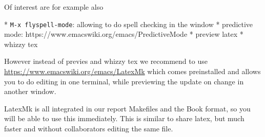 
Of interest are for example also 

* \verb|M-x flyspell-mode|: allowing to do spell checking in the window
* predictive mode: https://www.emacswiki.org/emacs/PredictiveMode
* preview latex
* whizzy tex

However instead of previes and whizzy tex we recommend to use
\url{https://www.emacswiki.org/emacs/LatexMk} which comes preinstalled
and allows you to do editing in one terminal, while previewing the
update on change in another window.

LatexMk is all integrated in our report Makefiles and the Book format,
so you will be able to use this immediately. This is similar to share
latex, but much faster and without collaborators editing the same file.